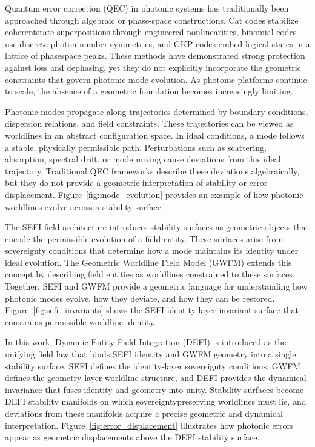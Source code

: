 \documentclass[aip,adv,reprint,floatfix]{revtex4-2}
\begin{document}
Quantum error correction (QEC) in photonic systems
has traditionally been approached through algebraic or
phase-space constructions.\cite{DuttonSEFI2026} Cat codes stabilize coherentstate superpositions through engineered nonlinearities,
binomial codes use discrete photon-number symmetries,
and GKP codes embed logical states in a lattice of phasespace peaks. These methods have demonstrated strong
protection against loss and dephasing, yet they do not explicitly incorporate the geometric constraints that govern
photonic mode evolution. As photonic platforms continue to scale, the absence of a geometric foundation becomes increasingly limiting.

Photonic modes propagate along trajectories determined by boundary conditions, dispersion relations, and
field constraints.\cite{DuttonElectronField2026} These trajectories can be viewed as
worldlines in an abstract configuration space. In ideal
conditions, a mode follows a stable, physically permissible path. Perturbations such as scattering, absorption,
spectral drift, or mode mixing cause deviations from this
ideal trajectory. Traditional QEC frameworks describe
these deviations algebraically, but they do not provide
a geometric interpretation of stability or error displacement. Figure~\ref{fig:mode_evolution} provides an example
of how photonic worldlines evolve across a stability surface.

The SEFI field architecture introduces stability surfaces as geometric objects that encode the permissible
evolution of a field entity.\cite{DuttonSEFI2026} These surfaces arise from
sovereignty conditions that determine how a mode maintains its identity under ideal evolution. The Geometric
Worldline Field Model (GWFM)\cite{DuttonElectronField2026} extends this concept by
describing field entities as worldlines constrained to these
surfaces. Together, SEFI and GWFM provide a geometric language for understanding how photonic modes
evolve, how they deviate, and how they can be restored.
Figure~\ref{fig:sefi_invariants} shows the SEFI identity-layer
invariant surface that constrains permissible worldline identity.

In this work, Dynamic Entity Field Integration (DEFI)
is introduced as the unifying field law that binds SEFI
identity and GWFM geometry into a single stability surface.\cite{DuttonSEFI2026,DuttonElectronField2026} SEFI defines the identity-layer sovereignty conditions, GWFM defines the geometry-layer worldline structure, and DEFI provides the dynamical invariance that
fuses identity and geometry into unity. Stability surfaces
become DEFI stability manifolds on which sovereigntypreserving worldlines must lie, and deviations from these
manifolds acquire a precise geometric and dynamical interpretation. Figure~\ref{fig:error_displacement} illustrates
how photonic errors appear as geometric displacements above
the DEFI stability surface.
\end{document}
